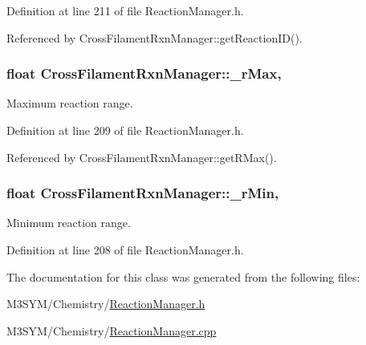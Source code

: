 Definition at line 211 of file Reaction\+Manager.\+h.



Referenced by Cross\+Filament\+Rxn\+Manager\+::get\+Reaction\+I\+D().

\hypertarget{classCrossFilamentRxnManager_a8027479055b5bc902c2f3eab39fc6d50}{
\subsubsection[{\+\_\+r\+Max}]{\setlength{\rightskip}{0pt plus 5cm}float Cross\+Filament\+Rxn\+Manager\+::\+\_\+r\+Max\hspace{0.3cm}{\ttfamily [protected]}, {\ttfamily [inherited]}}}\label{classCrossFilamentRxnManager_a8027479055b5bc902c2f3eab39fc6d50}


Maximum reaction range. 



Definition at line 209 of file Reaction\+Manager.\+h.



Referenced by Cross\+Filament\+Rxn\+Manager\+::get\+R\+Max().

\hypertarget{classCrossFilamentRxnManager_a0822316b3a9bea17ceecc12231ae8eee}{
\subsubsection[{\+\_\+r\+Min}]{\setlength{\rightskip}{0pt plus 5cm}float Cross\+Filament\+Rxn\+Manager\+::\+\_\+r\+Min\hspace{0.3cm}{\ttfamily [protected]}, {\ttfamily [inherited]}}}\label{classCrossFilamentRxnManager_a0822316b3a9bea17ceecc12231ae8eee}


Minimum reaction range. 



Definition at line 208 of file Reaction\+Manager.\+h.



The documentation for this class was generated from the following files\+:\begin{DoxyCompactItemize}
\item 
M3\+S\+Y\+M/\+Chemistry/\hyperlink{ReactionManager_8h}{Reaction\+Manager.\+h}\item 
M3\+S\+Y\+M/\+Chemistry/\hyperlink{ReactionManager_8cpp}{Reaction\+Manager.\+cpp}\end{DoxyCompactItemize}
